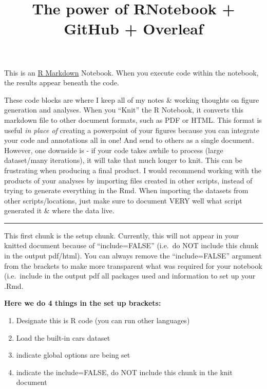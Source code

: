 \documentclass[
]{article}
\title{The power of RNotebook + GitHub + Overleaf}
\author{}
\date{\vspace{-2.5em}}
\providecommand{\tightlist}{%
  \setlength{\itemsep}{0pt}\setlength{\parskip}{0pt}}
\begin{document}
\maketitle

This is an \href{http://rmarkdown.rstudio.com}{R Markdown} Notebook.
When you execute code within the notebook, the results appear beneath
the code.

These code blocks are where I keep all of my notes \& working thoughts
on figure generation and analyses. When you ``Knit'' the R Notebook, it
converts this markdown file to other document formats, such as PDF or
HTML. This format is useful \emph{in place of} creating a powerpoint of
your figures because you can integrate your code and annotations all in
one! And send to others as a single document. However, one downside is -
if your code takes awhile to process (large dataset/many iterations), it
will take that much longer to knit. This can be frustrating when
producing a final product. I would recommend working with the products
of your analyses by importing files created in other scripts, instead of
trying to generate everything in the Rmd. When importing the datasets
from other scripts/locations, just make sure to document VERY well what
script generated it \& where the data live.

\begin{center}\rule{0.5\linewidth}{0.5pt}\end{center}

This first chunk is the setup chunk. Currently, this will not appear in
your knitted document because of ``include=FALSE'' (i.e.~do NOT include
this chunk in the output pdf/html). You can always remove the
``include=FALSE'' argument from the brackets to make more transparent
what was required for your notebook (i.e.~include in the output pdf all
packages used and information to set up your .Rmd.

\textbf{Here we do 4 things in the set up brackets:}

\begin{enumerate}
\def\labelenumi{\arabic{enumi}.}
\tightlist
\item
  Designate this is R code (you can run other languages)
\item
  Load the built-in cars dataset
\item
  indicate global options are being set
\item
  indicate the include=FALSE, do NOT include this chunk in the knit
  document
\end{enumerate}
\end{document}
